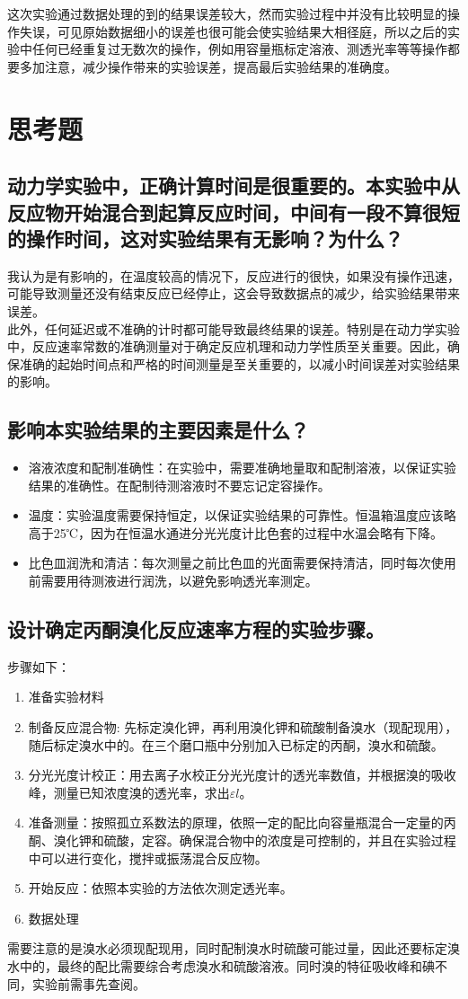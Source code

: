 \documentclass[hyperref,a4paper,UTF8]{ctexart}
\begin{document}
这次实验通过数据处理的到的结果误差较大，然而实验过程中并没有比较明显的操作失误，可见原始数据细小的误差也很可能会使实验结果大相径庭，所以之后的实验中任何已经重复过无数次的操作，例如用容量瓶标定溶液、测透光率等等操作都要多加注意，减少操作带来的实验误差，提高最后实验结果的准确度。


\section{思考题}
\subsection{动力学实验中，正确计算时间是很重要的。本实验中从反应物开始混合到起算反应时间，中间有一段不算很短的操作时间，这对实验结果有无影响？为什么？}
我认为是有影响的，在温度较高的情况下，反应进行的很快，如果没有操作迅速，可能导致测量还没有结束反应已经停止，这会导致数据点的减少，给实验结果带来误差。\\
此外，任何延迟或不准确的计时都可能导致最终结果的误差。特别是在动力学实验中，反应速率常数的准确测量对于确定反应机理和动力学性质至关重要。因此，确保准确的起始时间点和严格的时间测量是至关重要的，以减小时间误差对实验结果的影响。
\subsection{影响本实验结果的主要因素是什么？}
  \begin{itemize}
      \item 溶液浓度和配制准确性：在实验中，需要准确地量取和配制溶液，以保证实验结果的准确性。在配制待测溶液时不要忘记定容操作。
      \item 温度：实验温度需要保持恒定，以保证实验结果的可靠性。恒温箱温度应该略高于25℃，因为在恒温水通进分光光度计比色套的过程中水温会略有下降。
      \item 比色皿润洗和清洁：每次测量之前比色皿的光面需要保持清洁，同时每次使用前需要用待测液进行润洗，以避免影响透光率测定。

  \end{itemize}
  \subsection{设计确定丙酮溴化反应速率方程的实验步骤。}
    步骤如下：
    \begin{enumerate}
        \item 准备实验材料
        \item 制备反应混合物: 先标定溴化钾，再利用溴化钾和硫酸制备溴水（现配现用），随后标定溴水中的。在三个磨口瓶中分别加入已标定的丙酮，溴水和硫酸。
        \item 分光光度计校正：用去离子水校正分光光度计的透光率数值，并根据溴的吸收峰，测量已知浓度溴的透光率，求出$\varepsilon l$。
        \item 准备测量：按照孤立系数法的原理，依照一定的配比向容量瓶混合一定量的丙酮、溴化钾和硫酸，定容。确保混合物中的浓度是可控制的，并且在实验过程中可以进行变化，搅拌或振荡混合反应物。
        \item 开始反应：依照本实验的方法依次测定透光率。
        \item 数据处理
    \end{enumerate}

需要注意的是溴水必须现配现用，同时配制溴水时硫酸可能过量，因此还要标定溴水中的，最终的配比需要综合考虑溴水和硫酸溶液。同时溴的特征吸收峰和碘不同，实验前需事先查阅。
\end{document}
